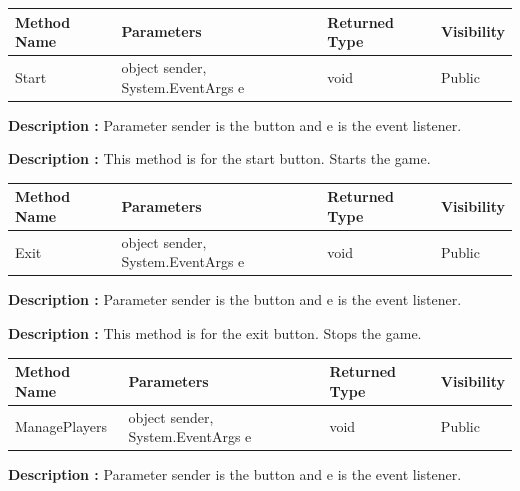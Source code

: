\documentclass[12pt]{article}
\begin{document}
\begin{table}[H]
    \begin{tabular}{|l|l|l|l|}
    \hline
    \rowcolor[HTML]{EFEFEF} 
    \cellcolor[HTML]{EFEFEF}\textbf{Method Name} & \textbf{Parameters}                    & \textbf{Returned Type} & \textbf{Visibility} \\ \hline
    Start                                        & object sender, System.EventArgs e      & void                   & Public             \\ \hline
    \end{tabular}
\end{table}

\textbf{Description :} Parameter sender is the button and e is the event listener.

\textbf{Description :} This method is for the start button. Starts the game.

\begin{table}[H]
    \begin{tabular}{|l|l|l|l|}
    \hline
    \rowcolor[HTML]{EFEFEF} 
    \cellcolor[HTML]{EFEFEF}\textbf{Method Name} & \textbf{Parameters}                    & \textbf{Returned Type} & \textbf{Visibility} \\ \hline
    Exit                                        & object sender, System.EventArgs e      & void                   & Public             \\ \hline
    \end{tabular}
\end{table}

\textbf{Description :} Parameter sender is the button and e is the event listener.

\textbf{Description :} This method is for the exit button. Stops the game.

\begin{table}[H]
    \begin{tabular}{|l|l|l|l|}
    \hline
    \rowcolor[HTML]{EFEFEF} 
    \cellcolor[HTML]{EFEFEF}\textbf{Method Name} & \textbf{Parameters}                    & \textbf{Returned Type} & \textbf{Visibility} \\ \hline
    ManagePlayers                                        & object sender, System.EventArgs e      & void                   & Public             \\ \hline
    \end{tabular}
\end{table}

\textbf{Description :} Parameter sender is the button and e is the event listener.
\end{document}
